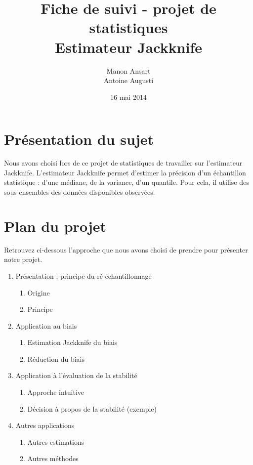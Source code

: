 \documentclass[a4paper,10pt]{article}
\title {Fiche de suivi - projet de statistiques\\ Estimateur Jackknife}
\author{Manon Ansart\\ Antoine Augusti}
\date{16 mai 2014}
\begin{document}
	\maketitle

	\section{Présentation du sujet}
	Nous avons choisi lors de ce projet de statistiques de travailler sur l'estimateur Jackknife. L'estimateur Jackknife permet d'estimer la précision d'un échantillon statistique : d'une médiane, de la variance, d'un quantile. Pour cela, il utilise des sous-ensembles des données disponibles observées.

	\section{Plan du projet}
	Retrouvez ci-dessous l'approche que nous avons choisi de prendre pour présenter notre projet.

	\vspace{10px}
	\begin{enumerate}
		\item Présentation : principe du ré-échantillonnage
		\begin{enumerate}
			\item Origine
			\item Principe
		\end{enumerate}
		\item Application au biais
		\begin{enumerate}
			\item Estimation Jackknife du biais
			\item Réduction du biais
		\end{enumerate}
		\item Application à l'évaluation de la stabilité
		\begin{enumerate}
			\item Approche intuitive
			\item Décision à propos de la stabilité (exemple)
		\end{enumerate}
		\item Autres applications
		\begin{enumerate}
			\item Autres estimations
			\item Autres méthodes
		\end{enumerate}
	\end{enumerate}
\end{document}
